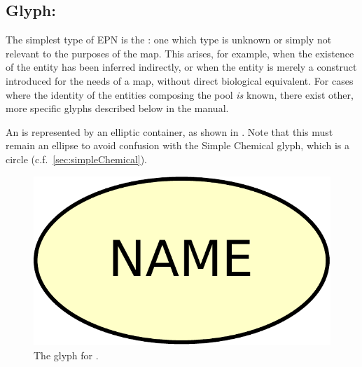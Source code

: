 \subsection{Glyph: }
\label{sec:unspecifiedEntity}

The simplest type of EPN is the : one which type is unknown or simply not relevant to the purposes of the map. This arises, for example, when the existence of the entity has been inferred indirectly, or when the entity is merely a construct introduced for the needs of a map, without direct biological equivalent.  For cases where the identity of the entities composing the pool \emph{is} known, there exist other, more specific glyphs described below in the manual.

An  is represented by an elliptic container, as shown in .  Note that this
must remain an ellipse to avoid confusion with the Simple Chemical glyph, which is a circle (c.f.\, \ref{sec:simpleChemical}).

\begin{figure}[H]
  \centering
  \includegraphics[scale = 0.3]{images/unspecified}
  \caption{The \PD glyph for .}
  \label{fig:unspecified}
\end{figure}

